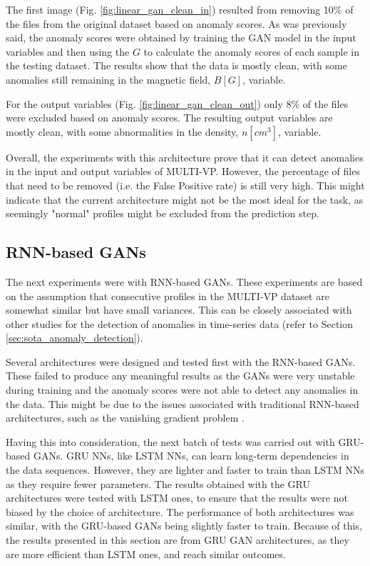The first image (Fig. \ref{fig:linear_gan_clean_in}) resulted from removing 10\% of the files from the original dataset based on anomaly scores. As was previously said, the anomaly scores were obtained by training the GAN model in the input variables and then using the $G$ to calculate the anomaly scores of each sample in the testing dataset. The results show that the data is mostly clean, with some anomalies still remaining in the magnetic field, $B [G]$, variable.

For the output variables (Fig. \ref{fig:linear_gan_clean_out}) only 8\% of the files were excluded based on anomaly scores. The resulting output variables are mostly clean, with some abnormalities in the density, $n [cm^3]$, variable.

Overall, the experiments with this architecture prove that it can detect anomalies in the input and output variables of MULTI-VP. However, the percentage of files that need to be removed (i.e. the False Positive rate) is still very high. This might indicate that the current architecture might not be the most ideal for the task, as seemingly "normal" profiles might be excluded from the prediction step.


\subsection{RNN-based GANs}\label{sec:gan_experiment_lstm}

The next experiments were with RNN-based GANs. These experiments are based on the assumption that consecutive profiles in the MULTI-VP dataset are somewhat similar but have small variances. This can be closely associated with other studies for the detection of anomalies in time-series data (refer to Section \ref{sec:sota_anomaly_detection}). 

Several architectures were designed and tested first with the RNN-based GANs. These failed to produce any meaningful results as the GANs were very unstable during training and the anomaly scores were not able to detect any anomalies in the data. This might be due to the issues associated with traditional RNN-based architectures, such as the vanishing gradient problem \cite{Schmidt_RecurrentNeuralNetworks_2019}.

Having this into consideration, the next batch of tests was carried out with GRU-based GANs. GRU NNs, like LSTM NNs, can learn long-term dependencies in the data sequences. However, they are lighter and faster to train than LSTM NNs as they require fewer parameters. The results obtained with the GRU architectures were tested with LSTM ones, to ensure that the results were not biased by the choice of architecture. The performance of both architectures was similar, with the GRU-based GANs being slightly faster to train. Because of this, the results presented in this section are from GRU GAN architectures, as they are more efficient than LSTM ones, and reach similar outcomes.

